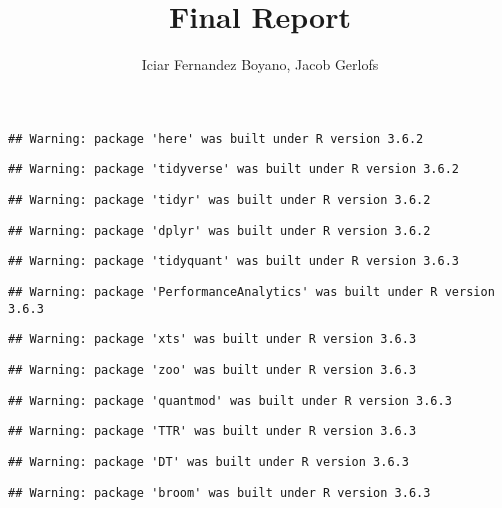 \documentclass[
]{article}
\title{Final Report}
\author{Iciar Fernandez Boyano, Jacob Gerlofs}
\date{}
\begin{document}
\maketitle

\begin{verbatim}
## Warning: package 'here' was built under R version 3.6.2
\end{verbatim}

\begin{verbatim}
## Warning: package 'tidyverse' was built under R version 3.6.2
\end{verbatim}

\begin{verbatim}
## Warning: package 'tidyr' was built under R version 3.6.2
\end{verbatim}

\begin{verbatim}
## Warning: package 'dplyr' was built under R version 3.6.2
\end{verbatim}

\begin{verbatim}
## Warning: package 'tidyquant' was built under R version 3.6.3
\end{verbatim}

\begin{verbatim}
## Warning: package 'PerformanceAnalytics' was built under R version 3.6.3
\end{verbatim}

\begin{verbatim}
## Warning: package 'xts' was built under R version 3.6.3
\end{verbatim}

\begin{verbatim}
## Warning: package 'zoo' was built under R version 3.6.3
\end{verbatim}

\begin{verbatim}
## Warning: package 'quantmod' was built under R version 3.6.3
\end{verbatim}

\begin{verbatim}
## Warning: package 'TTR' was built under R version 3.6.3
\end{verbatim}

\begin{verbatim}
## Warning: package 'DT' was built under R version 3.6.3
\end{verbatim}

\begin{verbatim}
## Warning: package 'broom' was built under R version 3.6.3
\end{verbatim}
\end{document}

